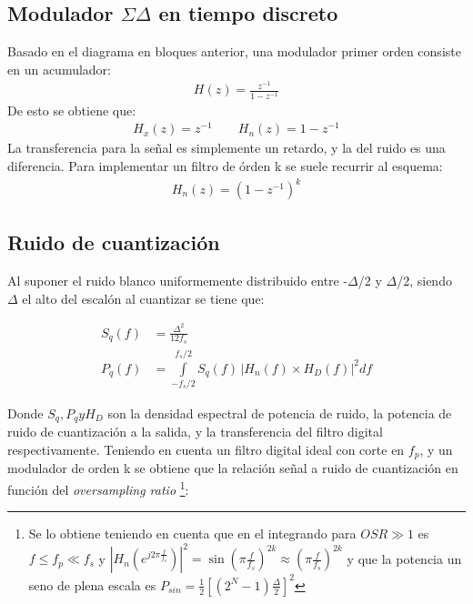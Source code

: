 \documentclass[a4paper,conference]{IEEEtran}
\begin{document}
\subsection{Modulador $\Sigma\Delta$ en tiempo discreto}
Basado en el diagrama en bloques anterior, una modulador primer orden consiste en un acumulador:
\begin{align}
H(z)=\frac{z^{-1}}{1-z^{-1}}
\end{align}
De esto se obtiene que:
\begin{align}
H_x(z)=z^{-1} \qquad
H_n(z)=1-z^{-1}
\end{align}
La transferencia para la señal es simplemente un retardo, y la del ruido es una diferencia.
Para implementar un filtro de \'orden k se suele recurrir al esquema:
\begin{align}
H_n(z)=\left( 1-z^{-1}\right)^{k}
\end{align}

\subsection{Ruido de cuantizaci\'on}
Al suponer el ruido blanco uniformemente distribuido entre -$\Delta$/2 y $\Delta$/2, siendo $\Delta$ el alto del escal\'on al cuantizar se tiene que:

\begin{align}
S_q(f) &= \frac{\Delta^{2}}{12f_s}\\
P_{q}(f) &=\int\limits_{-f_s/2}^{f_s/2}S_q(f) \, |H_n(f) \times H_D(f)|^{2} df
\end{align}

Donde $S_q,P_q y H_D$ son la densidad espectral de potencia de ruido, la potencia de ruido de cuantizaci\'on a la salida, y la transferencia del filtro digital respectivamente.
Teniendo en cuenta un filtro digital ideal con corte en $f_p$, y un modulador de orden k se obtiene que la relaci\'on se\~nal a ruido de cuantizaci\'on en funci\'on del \textit{oversampling ratio}
\footnote[1]{
Se lo obtiene teniendo en cuenta que en el integrando para $OSR\gg 1$ es $f\leq f_p\ll f_s$ y $|H_n(e^{j2 \pi \frac{f}{f_s}})|^{2}= \sin(\pi \frac{f}{f_s})^{2k} \approx (\pi\frac{f}{f_s})^{2k}$ y que la potencia un seno de plena escala es $P_{sin}=\frac{1}{2} [(2^N-1)\frac{\Delta}{2}]^{2}$
}:
\end{document}

